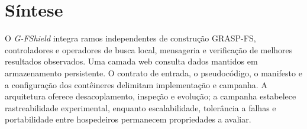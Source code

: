 \section{Síntese}

O \textit{G-FShield} integra ramos independentes de construção GRASP-FS, controladores e operadores de busca local, mensageria e verificação de melhores resultados observados. Uma camada web consulta dados mantidos em armazenamento persistente. O contrato de entrada, o pseudocódigo, o manifesto e a configuração dos contêineres delimitam implementação e campanha. A arquitetura oferece desacoplamento, inspeção e evolução; a campanha estabelece rastreabilidade experimental, enquanto escalabilidade, tolerância a falhas e portabilidade entre hospedeiros permanecem propriedades a avaliar.
